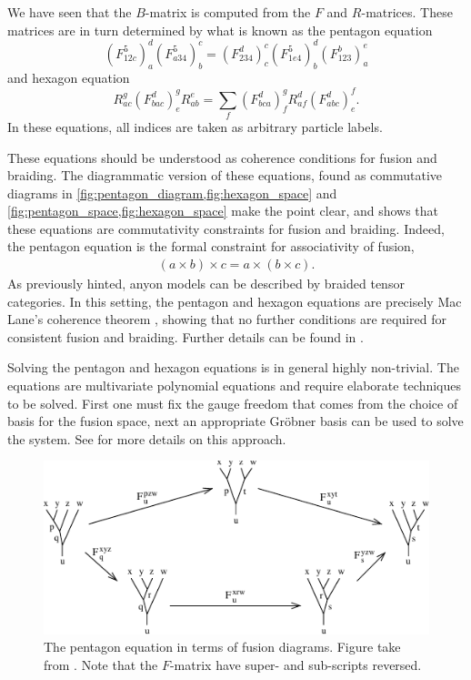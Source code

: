 \documentclass[a4paper,10pt,oneside]{book}
\theoremstyle{plain}
\theoremstyle{definition}
\theoremstyle{remark}
\begin{document}
We have seen that the $B$-matrix is computed from the $F$ and $R$-matrices. These matrices are in turn determined by what is known as the pentagon equation
\begin{equation}\label{eq:pentagon}
  \left(F_{12c}^5\right)^d_a \left(F_{a34}^5\right)^c_b = \left(F_{234}^d\right)_c^c \left( F_{1e4}^5 \right)^d_b \left( F_{123}^b \right)^e_a
\end{equation}
and hexagon equation
\begin{equation}\label{eq:hexagon}
  R_{ac}^g \left(F_{bac}^d\right)^g_e R_{ab}^e = \sum_{f} \left(F_{bca}^d\right)^g_f R_{af}^d \left(F_{abc}^d\right)^f_e.
\end{equation}
In these equations, all indices are taken as arbitrary particle labels.

These equations should be understood as coherence conditions for fusion and braiding. The diagrammatic version of these equations, found as commutative diagrams in \cref{fig:pentagon_diagram,fig:hexagon_space} and \cref{fig:pentagon_space,fig:hexagon_space} make the point clear, and shows that these equations are commutativity constraints for fusion and braiding. Indeed, the pentagon equation is the formal constraint for associativity of fusion,
\begin{align*}
  (a \times b) \times c = a \times (b \times c).
\end{align*}
As previously hinted, anyon models can be described by braided tensor categories. In this setting, the pentagon and hexagon equations are precisely Mac Lane's coherence theorem \cite{mac lane}, showing that no further conditions are required for consistent fusion and braiding. Further details can be found in \cite{kitaev,preskill}.

Solving the pentagon and hexagon equations is in general highly non-trivial. The equations are multivariate polynomial equations and require elaborate techniques to be solved. First one must fix the gauge freedom that comes from the choice of basis for the fusion space, next an appropriate Gröbner basis can be used to solve the system. See \cite{bonderson} for more details on this approach.

\begin{figure}[h]
  \centering
  \includegraphics[width=1\linewidth]{img/pentagon_diagram.pdf}
  \caption{The pentagon equation in terms of fusion diagrams. Figure take from \cite{kitaev}. Note that the $F$-matrix have super- and sub-scripts reversed.}
  \label{fig:pentagon_diagram}
\end{figure}
\end{document}
